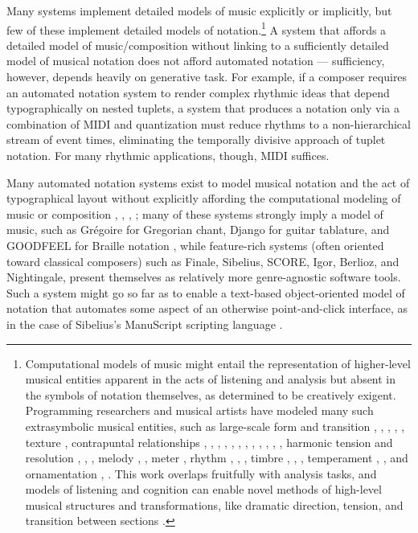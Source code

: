Many systems implement detailed models of music explicitly or implicitly, but few of these implement detailed models of notation.\footnote{Computational models of music might entail the representation of higher-level musical entities apparent in the acts of listening and analysis but absent in the symbols of notation themselves, as determined to be creatively exigent. Programming researchers and musical artists have modeled many such extrasymbolic musical entities, such as large-scale form and transition \cite{polansky1991morphological}, \cite{uno1994temporal}, \cite{dobrian1995algorithmic}, \cite{abrams1999higher}, \cite{Yoo1983}, texture \cite{Horenstein:2004kx}, contrapuntal relationships \cite{Boenn:2009oq}, \cite{Acevedo2005}, \cite{Anders:2011kl}, \cite{Balser:1990tg}, \cite{Jones:2000hc}, \cite{uno1994temporal}, \cite{Bell:1995ij}, \cite{farbood2001analysis}, \cite{Cope:2002fv}, \cite{Laurson:2005dz}, \cite{Polansky:2011fu}, \cite{Ebcioglu:1980kl}, harmonic tension and resolution \cite{Melo2003}, \cite{Wiggins1999}, \cite{Foster:1995qa}, melody \cite{Hornel:1993mi}, \cite{Smith:1992pi}, meter \cite{Hamanaka:2005ff}, rhythm \cite{Nauert2007}, \cite{Degazio:1996lh}, \cite{Collins:2003bs}, timbre \cite{Xenakis:1991fu}, \cite{Creasey:1996ye}, \cite{Osaka2004}, temperament \cite{Seymour:2007qo}, \cite{Graf:2006il}, and ornamentation \cite{Ariza:2003zt}, \cite{Chico-Topfer:1998jl}. This work overlaps fruitfully with analysis tasks, and models of listening and cognition can enable novel methods of high-level musical structures and transformations, like dramatic direction, tension, and transition between sections \cite[108]{Collins2009}.} A system that affords a detailed model of music/composition without linking to a sufficiently detailed model of musical notation does not afford automated notation --- sufficiency, however, depends heavily on generative task. For example, if a composer requires an automated notation system to render complex rhythmic ideas that depend typographically on nested tuplets, a system that produces a notation only via a combination of MIDI and quantization must reduce rhythms to a non-hierarchical stream of event times, eliminating the temporally divisive approach of tuplet notation. For many rhythmic applications, though, MIDI suffices. 

Many automated notation systems exist to model musical notation and the act of typographical layout without explicitly affording the computational modeling of music or composition \cite{Smith:1972mw}, \cite{Nienhuys:2003ve}, \cite{Hoos:1998bd}, \cite{hamel1noteability}; many of these systems strongly imply a model of music, such as Gr\'{e}goire for Gregorian chant, Django for guitar tablature, and GOODFEEL for Braille notation \cite{2006}, while feature-rich systems (often oriented toward classical composers) such as Finale, Sibelius, SCORE, Igor, Berlioz, and Nightingale, present themselves as relatively more genre-agnostic software tools. Such a system might go so far as to enable a text-based object-oriented model of notation that automates some aspect of an otherwise point-and-click interface, as in the case of Sibelius's ManuScript scripting language \cite{Technology:qc}. 

